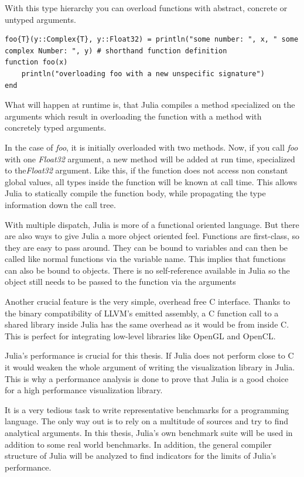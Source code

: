 With this type hierarchy you can overload functions with abstract, concrete or untyped arguments.

\begin{lstlisting}
foo{T}(y::Complex{T}, y::Float32) = println("some number: ", x, " some complex Number: ", y) # shorthand function definition
function foo(x)
    println("overloading foo with a new unspecific signature")
end
\end{lstlisting}

What will happen at runtime is, that Julia compiles a method specialized on the arguments which result in overloading the function with a method with concretely typed arguments.

In the case of \textit{foo}, it is initially overloaded with two methods.
Now, if you call \textit{foo} with one \textit{Float32} argument, a new method will be added at run time, specialized to the\textit{Float32} argument.
Like this, if the function does not access non constant global values, all types inside the function will be known at call time.
This allows Julia to statically compile the function body, while propagating the type information down the call tree.

With multiple dispatch, Julia is more of a functional oriented language. But there are also ways to give Julia a more object oriented feel.
Functions are first-class, so they are easy to pass around. 
They can be bound to variables and can then be called like normal functions via the variable name. This implies that functions can also be bound to objects.
There is no self-reference available in Julia so the object still needs to be passed to the function via the arguments

Another crucial feature is the very simple, overhead free C interface. 
Thanks to the binary compatibility of \ac{LLVM}'s emitted assembly, a C function call to a shared library inside Julia has the same overhead as it would be from inside C\cite{CCALL}. 
This is perfect for integrating low-level libraries like \ac{OpenGL} and \ac{OpenCL}.

Julia's performance is crucial for this thesis. 
If Julia does not perform close to C it would weaken the whole argument of writing the visualization library in Julia.
This is why a performance analysis is done to prove that Julia is a good choice for a high performance visualization library.

It is a very tedious task to write representative benchmarks for a programming language. 
The only way out is to rely on a multitude of sources and try to find analytical arguments.
In this thesis, Julia's own benchmark suite will be used in addition to some real world benchmarks.
In addition, the general compiler structure of Julia will be analyzed to find indicators for the limits of Julia's performance.

